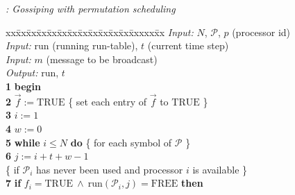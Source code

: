 \documentclass{elsart}
\newcommand{\keyw}[1]{\hbox{\bf #1}}
\begin{document}
\begin{alg}{\emph{: Gossiping with permutation scheduling}}
\begin{tabbing}
xx\=xx\=xx\=xx\=xx\=xx\=xx\=xx\=xx\=xx\=xx\=xx\=xxxxx\=xx\kill
         \> \> \emph{Input:\/} $N$, $\mathcal{P}$, $p$ (processor id)\\
         \> \> \emph{Input:\/} $\mathrm{run}$ (running run-table), $t$ (current time step)\\
         \> \> \emph{Input:\/} $m$ (message to be broadcast)\\
         \> \> \emph{Output:\/} $\mathrm{run}$, $t$\\
{\bf 1} \> \> \keyw{begin}\\
{\bf 2} \> \> \> $\vec{f} := \mathrm{TRUE}$ \>\>\>\>\>\>\>\>\>\> \{ set each entry of $\vec{f}$ to $\mathrm{TRUE}$ \} \\
{\bf 3} \> \> \> $i := 1$ \\
{\bf 4} \> \> \> $w := 0$ \\
{\bf 5} \> \> \> \keyw{while} $i\leq N$ \keyw{do} \>\>\>\>\>\>\>\>\>\> \{ for each symbol of $\mathcal P$ \} \\
{\bf 6} \> \> \> \> $j := i + t + w -1$ \\

         \> \> \> \> \{ if $\mathcal{P}_i$ has never been used and processor $i$ is available \} \\
{\bf 7} \> \> \> \> \keyw{if} $f_i = \mathrm{TRUE}  \ \wedge \ \mathrm{run}(\mathcal{P}_i, j) = \mathrm{FREE}$ 
                     \keyw{then} \\


\end{tabbing}
\end{alg}
\end{document}
